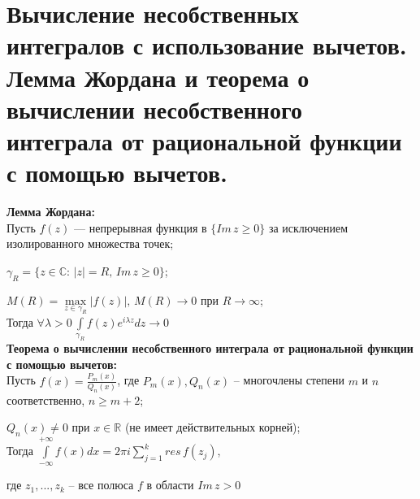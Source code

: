 \newpage 
\section{Вычисление несобственных интегралов с использование вычетов. Лемма Жордана и теорема о вычислении несобственного интеграла от рациональной функции с помощью вычетов.}

\textbf{Лемма Жордана:}\\[2mm]
Пусть  $f(z)$ --- непрерывная функция в $\{Im\,z \geq 0\}$ за исключением изолированного множества точек;

$\gamma_{R} =\{z\in\mathbb{C}: \, |z|=R, \, Im\,z\geq 0\}$;

$M(R)=\underset{z\in \gamma_{R}}{\max}|f(z)|, \, M(R) \rightarrow 0$ при $R\rightarrow \infty$;\\[2mm]
Тогда $\forall \lambda > 0 \, \int\limits_{\gamma_{R}} f(z)e^{i\lambda z}dz\rightarrow 0$\\[4mm]

\textbf{Теорема о вычислении несобственного интеграла от рациональной функции с помощью вычетов:}\\[2mm]
Пусть  $f(x)=\frac{P_m(x)}{Q_n(x)}$, где $P_m(x), Q_n(x)$ -- многочлены степени $m$ и $n$ соответственно, $n\geq m+2$;

$Q_n(x)\neq 0$ при $x \in \mathbb{R}$ (не имеет действительных корней);\\[2mm]
Тогда $\int\limits_{-\infty}^{+\infty}f(x)dx=2\pi i \sum_{j=1}^k res\,f(z_j)$, 

где $z_1, ...,z_k$ -- все полюса $f$ в области $Im\,z >0$

